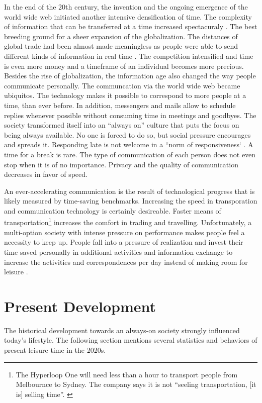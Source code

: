 \documentclass[12pt,numbers=noenddot,parskip,bibliography=totocnumbered,listof=totocnumbered]{scrreprt}
\begin{document}
In the end of the 20th century, the invention and the ongoing emergence of the world wide web initiated another intensive densification of time. The complexity of information that can be transferred at a time increased spectacuraly \citep[p.45]{wajcman2014}. The best breeding ground for a sheer expansion of the globalization. The distances of global trade had been almost made meaningless as people were able to send different kinds of information in real time \citep[p.17]{wajcman2014}. The competition intensified and time is even more money and a timeframe of an individual becomes more precious. Besides the rise of globalization, the information age also changed the way people communicate personally. The communcation via the world wide web became ubiquitos. The technology makes it possible to correspond to more people at a time, than ever before. In addition, messengers and mails allow to schedule replies whenever possible without consuming time in meetings and goodbyes. The society transformed itself into an ``always on'' culture that puts the focus on being always available. No one is forced to do so, but social pressure encourages and spreads it. Responding late is not welcome in a ``norm of responsiveness` \citep[p.96]{wajcman2014}. A time for a break is rare. The type of communication of each person does not even stop when it is of no importance. Privacy and the quality of communication decreases in favor of speed.

An ever-accelerating communication is the result of technological progress that is likely measured by time-saving benchmarks. Increasing the speed in transporation and communication technology is certainly desireable. Faster means of transportation\footnote{The Hyperloop One will need less than a hour to transport people from Melbournce to Sydney. The company says it is not ``seeling transportation, [it is] selling time''. \cite{hyperloop2017}} increases the comfort in trading and travelling. Unfortunately, a multi-option society with intense pressure on performance makes people feel a necessity to keep up. People fall into a pressure of realization and invest their time saved personally in additional activities and information exchange to increase the activities and correspondences per day instead of making room for leisure \citep[p.27-30]{gross1994}.

\section{Present Development}
The historical development towards an always-on society strongly influenced today's lifestyle. The following section mentions several statistics and behaviors of present leisure time in the 2020s.
\end{document}
